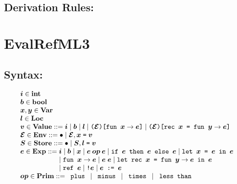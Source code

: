 \documentclass[11pt]{jarticle}
\begin{document}
\subsection*{Derivation Rules:}
\EvalDContMLivDisplayRules



\newpage
\section*{EvalRefML3}



\subsection*{Syntax:}

\[\begin{array}{l}
\EvalRefMLiiiMV{i}[] \in \mathbf{int}\\
\EvalRefMLiiiMV{b}[] \in \mathbf{bool}\\
\EvalRefMLiiiMV{x}[], \EvalRefMLiiiMV{y}[] \in
\mathbf{Var}\\
\EvalRefMLiiiMV{l}[] \in \mathbf{Loc}\\
\EvalRefMLiiiMV{v}[] \in \mathbf{Value} ::= \EvalRefMLiiiMV{i}[]
\mid \EvalRefMLiiiMV{b}[] \mid \EvalRefMLiiiMV{l}[]
\mid \EvalRefMLiiiFunTerm{\EvalRefMLiiiMV{env}[]}{\EvalRefMLiiiMV{x}[]}
{\EvalRefMLiiiMV{e}[]} \mid \EvalRefMLiiiRecTerm{\EvalRefMLiiiMV{env}[]}
{\EvalRefMLiiiMV{x}[]}{\EvalRefMLiiiMV{y}[]}
{\EvalRefMLiiiMV{e}[]}\\
\EvalRefMLiiiMV{env}[] \in \mathbf{Env} ::= \EvalRefMLiiiEmptyTerm
\mid \EvalRefMLiiiBindTerm{\EvalRefMLiiiMV{env}[]}{\EvalRefMLiiiMV{x}[]}
{\EvalRefMLiiiMV{v}[]}\\
\EvalRefMLiiiMV{s}[] \in \mathbf{Store} ::= \EvalRefMLiiiEmptySTerm
\mid \EvalRefMLiiiBlockTerm{\EvalRefMLiiiMV{s}[]}{\EvalRefMLiiiMV{l}[]}
{\EvalRefMLiiiMV{v}[]}\\
\EvalRefMLiiiMV{e}[] \in \mathbf{Exp} ::= \EvalRefMLiiiMV{i}[]
\mid \EvalRefMLiiiMV{b}[] \mid \EvalRefMLiiiMV{x}[]
\mid \EvalRefMLiiiBinOpTerm{\EvalRefMLiiiMV{op}[]}{\EvalRefMLiiiMV{e}[]}
{\EvalRefMLiiiMV{e}[]} \mid \EvalRefMLiiiIfTerm{\EvalRefMLiiiMV{e}[]}
{\EvalRefMLiiiMV{e}[]}{\EvalRefMLiiiMV{e}[]}
\mid \EvalRefMLiiiLetTerm{\EvalRefMLiiiMV{x}[]}{\EvalRefMLiiiMV{e}[]}
{\EvalRefMLiiiMV{e}[]}  \\ \hspace*{2.0cm}
\mid \EvalRefMLiiiAbsTerm{\EvalRefMLiiiMV{x}[]}
{\EvalRefMLiiiMV{e}[]} \mid \EvalRefMLiiiAppTerm{\EvalRefMLiiiMV{e}[]}
{\EvalRefMLiiiMV{e}[]} \mid \EvalRefMLiiiLetRecTerm{\EvalRefMLiiiMV{x}[]}
{\EvalRefMLiiiMV{y}[]}{\EvalRefMLiiiMV{e}[]}{\EvalRefMLiiiMV{e}[]}
 \\ \hspace*{2.0cm}
\mid \EvalRefMLiiiNewRefTerm{\EvalRefMLiiiMV{e}[]}
\mid \EvalRefMLiiiDerefTerm{\EvalRefMLiiiMV{e}[]}
\mid \EvalRefMLiiiAssignTerm{\EvalRefMLiiiMV{e}[]}
{\EvalRefMLiiiMV{e}[]}\\
\EvalRefMLiiiMV{op}[] \in \mathbf{Prim} ::= \EvalRefMLiiiPlusTerm
\mid \EvalRefMLiiiMinusTerm \mid \EvalRefMLiiiMultTerm
\mid \EvalRefMLiiiLtTerm\\
\end{array}\]
\end{document}

